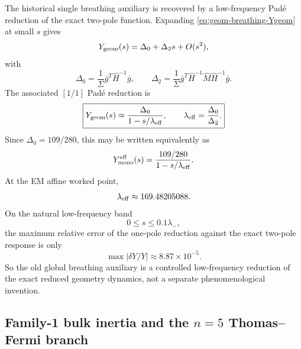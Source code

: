 \documentclass[11pt]{article}
\begin{document}
The historical single breathing auxiliary is recovered by a low-frequency Pad\'e reduction
of the exact two-pole function.
Expanding
\cref{eq:geom-breathing-Ygeom} at small \(s\) gives
\begin{equation}
Y_{\rm geom}(s)=\Delta_0+\Delta_2 s+O(s^2),
\label{eq:geom-breathing-small-s}
\end{equation}
with
\begin{equation}
\Delta_0=\frac{1}{\Sigma}\bar g^T\widehat H^{-1}\bar g,
\qquad
\Delta_2=\frac{1}{\Sigma}\bar g^T\widehat H^{-1}\widehat M\widehat H^{-1}\bar g.
\label{eq:geom-breathing-Delta0-Delta2}
\end{equation}
The associated \([1/1]\) Pad\'e reduction is
\begin{equation}
\boxed{
Y_{\rm geom}(s)\approx
\frac{\Delta_0}{1-s/\lambda_{\rm eff}},
\qquad
\lambda_{\rm eff}=\frac{\Delta_0}{\Delta_2}.
}
\label{eq:geom-breathing-pade}
\end{equation}
Since \(\Delta_0=109/280\), this may be written equivalently as
\begin{equation}
Y_{\rm mono}^{\rm eff}(s)
=
\frac{109/280}{1-s/\lambda_{\rm eff}}.
\label{eq:geom-breathing-ymono-eff}
\end{equation}
At the EM affine worked point,
\begin{equation}
\lambda_{\rm eff}\approx 169.48205088.
\label{eq:geom-breathing-lambda-eff-affine}
\end{equation}
On the natural low-frequency band
\begin{equation}
0\le s\le 0.1\lambda_-,
\label{eq:geom-breathing-natural-band}
\end{equation}
the maximum relative error of the one-pole reduction against the exact two-pole response
is only
\begin{equation}
\max|\delta Y/Y|\approx 8.87\times 10^{-5}.
\label{eq:geom-breathing-pade-error-affine}
\end{equation}
So the old global breathing auxiliary is a controlled low-frequency reduction of the
exact reduced geometry dynamics, not a separate phenomenological invention.

\subsection{Family-1 bulk inertia and the \texorpdfstring{$n=5$}{n=5} Thomas--Fermi branch}
\label{app:geom-breathing-TF}
\end{document}
